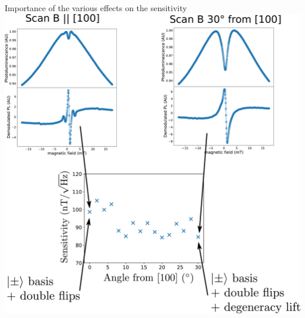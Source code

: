 \documentclass{beamer}
\begin{document}
\begin{frame}{Importance of the various effects on the sensitivity}
\centering
\includegraphics[width=\textwidth,height=0.9\textheight,keepaspectratio]{Slide magneto 3}
\end{frame}
\end{document}
